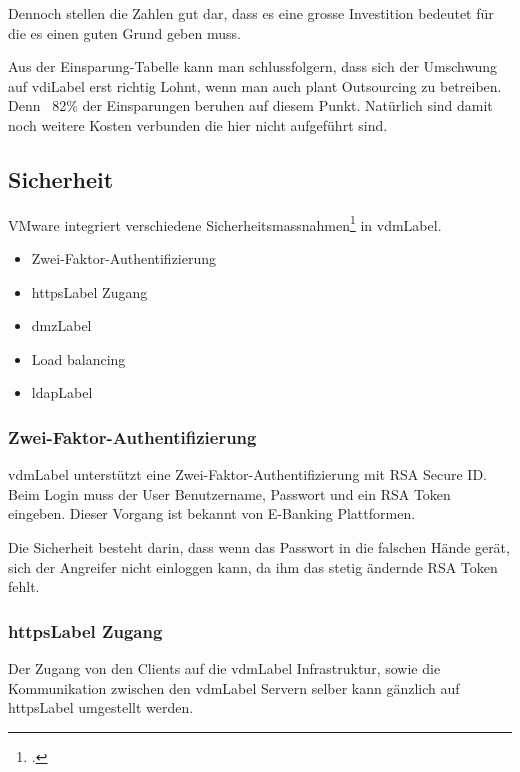 Dennoch stellen die Zahlen gut dar, dass es eine grosse Investition bedeutet für die es einen guten Grund geben muss.

Aus der Einsparung-Tabelle kann man schlussfolgern, dass sich der Umschwung auf \Gls{vdiLabel} erst richtig Lohnt, wenn man auch plant Outsourcing zu betreiben. Denn ~82\% der Einsparungen beruhen auf diesem Punkt. Natürlich sind damit noch weitere Kosten verbunden die hier nicht aufgeführt sind.

\subsection{Sicherheit}
VMware integriert verschiedene Sicherheitsmassnahmen\footcite{Introduction_to_Virtual_Desktop_Manager} in \Gls{vdmLabel}.

\begin{itemize}
\item Zwei-Faktor-Authentifizierung
\item \Gls{httpsLabel} Zugang
\item \Gls{dmzLabel}
\item Load balancing
\item \Gls{ldapLabel}
\end{itemize}

\subsubsection{Zwei-Faktor-Authentifizierung}
\Gls{vdmLabel} unterstützt eine Zwei-Faktor-Authentifizierung mit RSA Secure ID. Beim Login muss der User Benutzername, Passwort und ein RSA Token eingeben. Dieser Vorgang ist bekannt von E-Banking Plattformen. 

Die Sicherheit besteht darin, dass wenn das Passwort in die falschen Hände gerät, sich der Angreifer nicht einloggen kann, da ihm das stetig ändernde RSA Token fehlt.

\subsubsection{\Gls{httpsLabel} Zugang}
Der Zugang von den Clients auf die \Gls{vdmLabel} Infrastruktur, sowie die Kommunikation zwischen den \Gls{vdmLabel} Servern selber kann gänzlich auf \Gls{httpsLabel} umgestellt werden.

